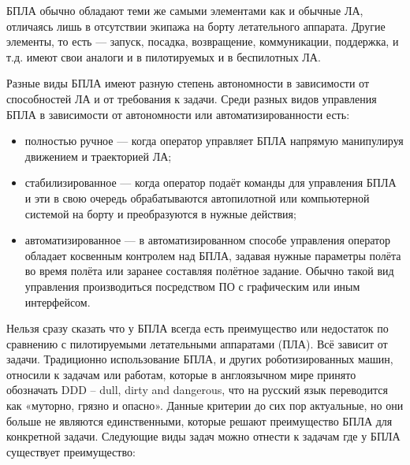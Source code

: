 \documentclass[specification,annotation]{itmo-student-thesis}
\begin{document}
БПЛА обычно обладают теми же самыми элементами как и обычные ЛА, отличаясь лишь
в отсутствии экипажа на борту летательного аппарата. Другие элементы, то есть ---
запуск, посадка, возвращение, коммуникации, поддержка, и т.д. имеют свои аналоги
и в пилотируемых и в беспилотных ЛА.

Разные виды БПЛА имеют разную степень автономности в зависимости от способностей
ЛА и от требования к задачи. Среди разных видов управления БПЛА в зависимости от
автономности или автоматизированности есть\cite{douglas-intro-to-uas}:

\begin{itemize}
  \item полностью ручное --- когда оператор управляет БПЛА напрямую манипулируя
    движением и траекторией ЛА;
  \item стабилизированное --- когда оператор подаёт команды для управления БПЛА и
    эти в свою очередь обрабатываются автопилотной или компьютерной системой на
    борту и преобразуются в нужные действия;
  \item автоматизированное --- в автоматизированном способе управления оператор
    обладает косвенным контролем над БПЛА, задавая нужные параметры полёта во
    время полёта или заранее составляя полётное задание. Обычно такой вид
    управления производиться посредством ПО с графическим или иным интерфейсом.
\end{itemize}

Нельзя сразу сказать что у БПЛА всегда есть преимущество или недостаток по
сравнению с пилотируемыми летательными аппаратами (ПЛА). Всё зависит от задачи.
Традиционно использование БПЛА, и других роботизированных машин, относили к
задачам или работам, которые в англоязычном мире принято обозначать DDD -- dull,
dirty and dangerous, что на русский язык переводится как «муторно, грязно и
опасно». Данные критерии до сих пор актуальные, но они больше не являются
единственными, которые решают преимущество БПЛА для конкретной задачи. Следующие
виды задач можно отнести к задачам где у БПЛА существует преимущество:
\end{document}
